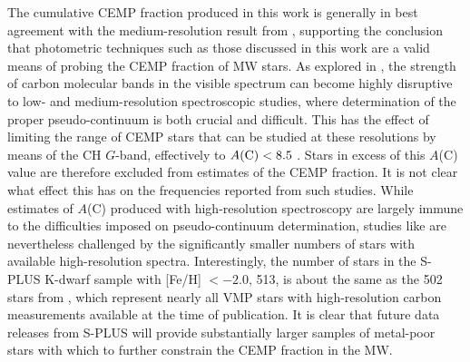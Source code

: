 \documentclass[twocolumn,trackchanges]{aastex63}
\begin{document}
The cumulative CEMP fraction produced in this work is generally in best agreement with the medium-resolution result from \citet{Yoon:2018:AEGIS}, supporting the conclusion that photometric techniques such as those discussed in this work are a valid means of probing the CEMP fraction of MW stars. As explored in \citet{Yoon:2020}, the strength of carbon molecular bands in the visible spectrum can become highly disruptive to low- and medium-resolution spectroscopic studies, where determination of the proper pseudo-continuum is both crucial and difficult. This has the effect of limiting the range of CEMP stars that can be studied at these resolutions by means of the CH $G$-band, effectively to $A(\rm{C}) < 8.5$ \citep{Yoon:2020}. Stars in excess of this $A$(C) value are therefore excluded from estimates of the CEMP fraction. It is not clear what effect this has on the frequencies reported from such studies. While estimates of $A$(C) produced with high-resolution spectroscopy are largely immune to the difficulties imposed on pseudo-continuum determination, studies like \citet{Placco:2014} are nevertheless challenged by the significantly smaller numbers of stars with available high-resolution spectra. Interestingly, the number of stars in the S-PLUS K-dwarf sample with [Fe/H] $<-2.0$, 513, is about the same as the 502 stars from \citep{Placco:2014}, which represent nearly all VMP stars with high-resolution carbon measurements available at the time of publication. It is clear that future data releases from S-PLUS will provide substantially larger samples of metal-poor stars with which to further constrain the CEMP fraction in the MW.\\




\end{document}
